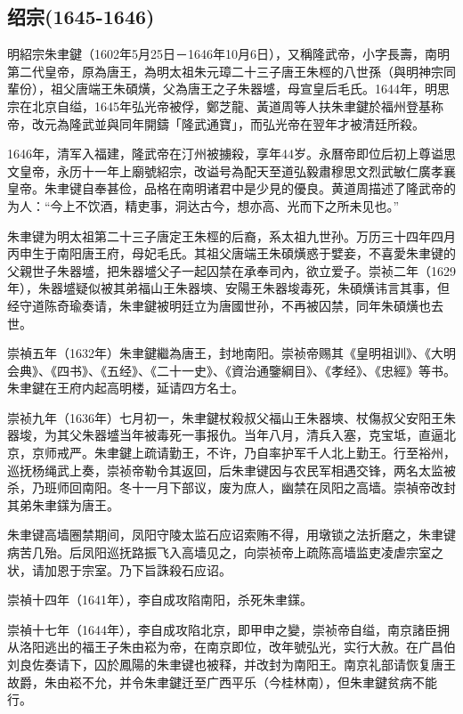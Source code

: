 \subsection{绍宗\tiny(1645-1646)}

明紹宗朱聿鍵（1602年5月25日－1646年10月6日），又稱隆武帝，小字長壽，南明第二代皇帝，原為唐王，為明太祖朱元璋二十三子唐王朱桱的八世孫（與明神宗同輩份），祖父唐端王朱碩熿，父為唐王之子朱器墭，母宣皇后毛氏。1644年，明思宗在北京自缢，1645年弘光帝被俘，鄭芝龍、黃道周等人扶朱聿鍵於福州登基称帝，改元為隆武並與同年開鑄「隆武通寶」，而弘光帝在翌年才被清廷所殺。

1646年，清军入福建，隆武帝在汀州被擄殺，享年44岁。永曆帝即位后初上尊谥思文皇帝，永历十一年上廟號紹宗，改谥号為配天至道弘毅肅穆思文烈武敏仁廣孝襄皇帝。朱聿键自奉甚俭，品格在南明诸君中是少見的優良。黄道周描述了隆武帝的为人：“今上不饮酒，精吏事，洞达古今，想亦高、光而下之所未见也。”

朱聿键为明太祖第二十三子唐定王朱桱的后裔，系太祖九世孙。万历三十四年四月丙申生于南阳唐王府，母妃毛氏。其祖父唐端王朱碩熿惑于嬖妾，不喜愛朱聿键的父親世子朱器墭，把朱器墭父子一起囚禁在承奉司內，欲立爱子。崇祯二年（1629年），朱器墭疑似被其弟福山王朱器塽、安陽王朱器埈毒死，朱碩熿讳言其事，但经守道陈奇瑜奏请，朱聿鍵被明廷立为唐國世孙，不再被囚禁，同年朱碩熿也去世。

崇禎五年（1632年）朱聿鍵繼為唐王，封地南阳。崇祯帝赐其《皇明祖训》、《大明会典》、《四书》、《五经》、《二十一史》、《資治通鑒綱目》、《孝经》、《忠經》等书。朱聿鍵在王府内起高明楼，延请四方名士。

崇祯九年（1636年）七月初一，朱聿鍵杖殺叔父福山王朱器塽、杖傷叔父安阳王朱器埈，为其父朱器墭当年被毒死一事报仇。当年八月，清兵入塞，克宝坻，直逼北京，京师戒严。朱聿鍵上疏请勤王，不许，乃自率护军千人北上勤王。行至裕州，巡抚杨绳武上奏，崇祯帝勒令其返回，后朱聿键因与农民军相遇交锋，两名太监被杀，乃班师回南阳。冬十一月下部议，废为庶人，幽禁在凤阳之高墙。崇禎帝改封其弟朱聿鏼为唐王。

朱聿键高墙圈禁期间，凤阳守陵太监石应诏索贿不得，用墩锁之法折磨之，朱聿键病苦几殆。后凤阳巡抚路振飞入高墙见之，向崇祯帝上疏陈高墙监吏凌虐宗室之状，请加恩于宗室。乃下旨誅殺石应诏。

崇禎十四年（1641年），李自成攻陷南阳，杀死朱聿鏼。

崇禎十七年（1644年），李自成攻陷北京，即甲申之變，崇祯帝自缢，南京諸臣拥从洛阳逃出的福王子朱由崧为帝，在南京即位，改年號弘光，实行大赦。在广昌伯刘良佐奏请下，囚於鳳陽的朱聿键也被释，并改封为南阳王。南京礼部请恢复唐王故爵，朱由崧不允，并令朱聿鍵迁至广西平乐（今桂林南），但朱聿鍵贫病不能行。

